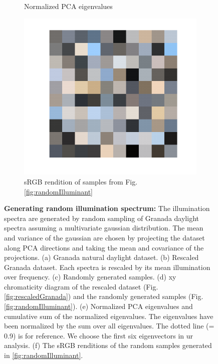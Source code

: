 \documentclass{jov}
\begin{document}
\begin{figure}
\begin{subfigure}[b]{0.3 \textwidth}
        \caption{Normalized PCA eigenvalues}
        \label{fig:granadaEV}
    \end{subfigure}
      	\begin{subfigure}[b]{0.3 \textwidth}
    \centering
        \includegraphics[width=\textwidth]{../Figures/Figure12/Figure12_f.pdf}
        \caption{sRGB rendition of samples from Fig.\ref{fig:randomIlluminant}}
        \label{fig:sRGBIlluminant}
    \end{subfigure}
    \caption{{\bf Generating random illumination spectrum:} The illumination spectra are generated by random sampling of Granada daylight spectra assuming a multivariate gaussian distribution. The mean and variance of the gaussian are chosen by projecting the dataset along PCA directions and taking the mean and covariance of the projections. (a) Granada natural daylight dataset. (b) Rescaled Granada dataset. Each spectra is rescaled by its mean illumination over frequency. (c) Randomly generated samples. (d) xy chromaticity diagram of the rescaled dataset (Fig. \ref{fig:rescaledGranada}) and the randomly generated samples (Fig.\ref{fig:randomIlluminant}). (e) Normalized PCA eigenvalues and cumulative sum of the normalized eigenvalues. The eigenvalues have been normalized by the sum over all eigenvalues. The dotted line (= 0.9) is for reference. We choose the first six eigenvectors in ur analysis. (f) The sRGB renditions of the random samples generated in \ref{fig:randomIlluminant}.}\label{fig:illluminationGeneration}
\end{figure}
\end{document}
